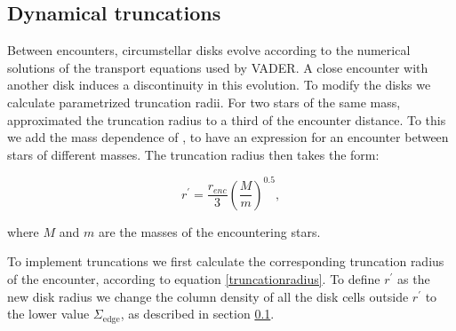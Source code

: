 \documentclass[fleqn,usenatbib]{mnras}
\begin{document}
\subsection{Dynamical truncations}\label{truncations}
Between encounters, circumstellar disks evolve according to the numerical solutions of the transport equations used by VADER. A close encounter with another disk induces a discontinuity in this evolution. To modify the disks we calculate parametrized truncation radii. For two stars of the same mass, \citet{rosotti2014} approximated the truncation radius to a third of the encounter distance. To this we add the mass dependence of \citet{bhandare2016}, to have an expression for an encounter between stars of different masses. The truncation radius then takes the form:

\begin{equation}\label{truncationradius}
{r^\prime} = \frac{r_{enc}}{3}\left(\frac{M}{m}\right)^{0.5},
\end{equation}

\noindent 
where $M$ and $m$ are the masses of the encountering stars.

To implement truncations we first calculate the corresponding truncation radius of the encounter, according to equation \ref{truncationradius}. To define $r^\prime$ as the new disk radius we change the column density of all the disk cells outside $r^\prime$ to the lower value $\Sigma_{\mathrm{edge}}$, as described in section \ref{truncations}.





\end{document}
